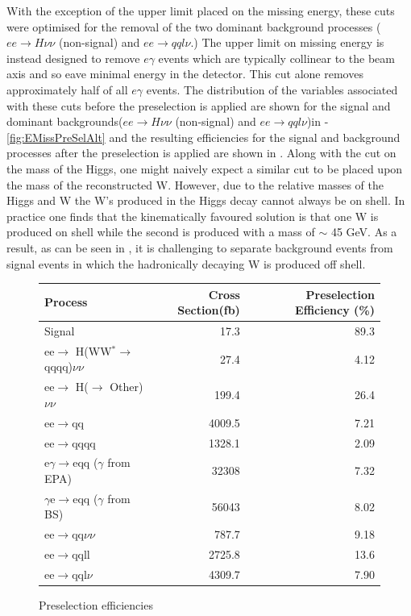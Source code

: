 With the exception of the upper limit placed on the missing energy, these cuts were optimised for the removal of the two dominant background processes ($ee\rightarrow H\nu\nu$ (non-signal) and $ee\rightarrow qql\nu$.) The upper limit on missing energy is instead designed to remove $e\gamma$ events which are typically collinear to the beam axis and so eave minimal energy in the detector. This cut alone removes approximately half of all $e\gamma$ events. The distribution of the variables associated with these cuts before the preselection is applied are shown for the signal and dominant backgrounds($ee\rightarrow H\nu\nu$ (non-signal) and $ee\rightarrow qql\nu$)in -\ref{fig:EMissPreSelAlt} and the resulting efficiencies for the signal and background processes after the preselection is applied are shown in . Along with the cut on the mass of the Higgs, one might naively expect a similar cut to be placed upon the mass of the reconstructed W. However, due to the relative masses of the Higgs and W the W's produced in the Higgs decay cannot always be on shell. In practice one finds that the kinematically favoured solution is that one W is produced on shell while the second is produced with a mass of $\sim$ 45 GeV. As a result, as can be seen in , it is challenging to separate background events from signal events in which the hadronically decaying W is produced off shell.

\begin{figure}
  \centering
  \begin{tabular}{l r r }
   \toprule
    Process & Cross Section(fb) & Preselection Efficiency (\%)     \\
    \midrule
    Signal             & 17.3    &   89.3 \\ 
    \midrule
    ee$\rightarrow$ H(WW$^*\rightarrow$qqqq)$\nu\nu$  & 27.4    &  4.12  \\
    \midrule
    ee$\rightarrow$ H($\rightarrow$ Other)$\nu\nu$ & 199.4 & 26.4  \\
    \midrule
    ee$\rightarrow$qq               & 4009.5    &  7.21 \\ 
    \midrule
    ee$\rightarrow$qqqq               & 1328.1    &  2.09  \\ 
    \midrule
    e$\gamma$$\rightarrow$eqq ($\gamma$ from EPA)                 & 32308    & 7.32   \\ 
    \midrule
    $\gamma$e$\rightarrow$eqq ($\gamma$ from BS)               &  56043   &  8.02 \\ 
    \midrule
    ee$\rightarrow$qq$\nu\nu$               & 787.7    & 9.18  \\ 
    \midrule
    ee$\rightarrow$qqll               & 2725.8    &   13.6 \\ 
    \midrule
    ee$\rightarrow$qql$\nu$              & 4309.7    &  7.90  \\ 
    \bottomrule
  \end{tabular}
  \caption[Preselection efficiencies]{Preselection efficiencies}
  \label{fig:preseleff}
\end{figure}



